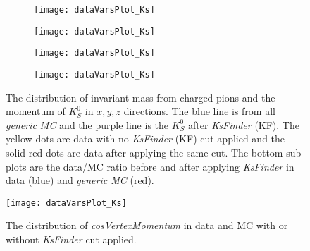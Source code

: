 \begin{figure}[htpb]
\begin{subfigure}{0.5\linewidth}
\texttt{[image: dataVarsPlot\_Ks]}
\end{subfigure}
\begin{subfigure}{0.5\linewidth}
\texttt{[image: dataVarsPlot\_Ks]}
\end{subfigure}
\bigskip
\begin{subfigure}{0.5\linewidth}
\texttt{[image: dataVarsPlot\_Ks]}
\end{subfigure}
\begin{subfigure}{0.5\linewidth}
\texttt{[image: dataVarsPlot\_Ks]}
\end{subfigure}
\caption{The distribution of invariant mass from charged pions and the momentum of $K_S^0$ in $x,y,z$ directions. The blue line is from all \textit{generic MC} and the purple line is the $K_S^0$ after \textit{KsFinder} (KF). The yellow dots are data with no \textit{KsFinder} (KF) cut applied and the solid red dots are data after applying the same cut. The bottom sub-plots are the data/MC ratio before and after applying \textit{KsFinder} in data (blue) and \textit{generic MC} (red).}
\label{fig:ksvalid_1}
\end{figure}

 \begin{figure}[htpb]
	\centering
	\texttt{[image: dataVarsPlot\_Ks]}
	\caption{The distribution of \textit{cosVertexMomentum} in data and MC with or without \textit{KsFinder} cut applied.}
	\label{fig:cosVex_dataMC}
\end{figure}

